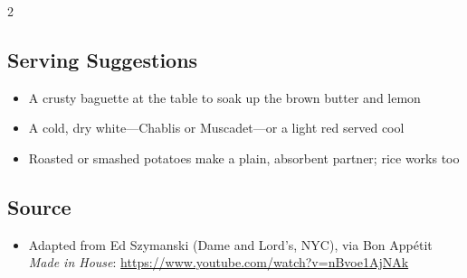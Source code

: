 \documentclass[11pt,letterpaper]{article}
\begin{document}
{\begin{multicols}{2}
\subsection*{Serving Suggestions}
\begin{itemize}
    \item A crusty baguette at the table to soak up the brown butter and lemon
    \item A cold, dry white---Chablis or Muscadet---or a light red served cool
    \item Roasted or smashed potatoes make a plain, absorbent partner; rice works too
\end{itemize}

\subsection*{Source}
\begin{itemize}
    \item Adapted from Ed Szymanski (Dame and Lord's, NYC), via Bon App\'etit \textit{Made in House}: \url{https://www.youtube.com/watch?v=nBvoe1AjNAk}
\end{itemize}

\end{multicols}
}
\end{document}
